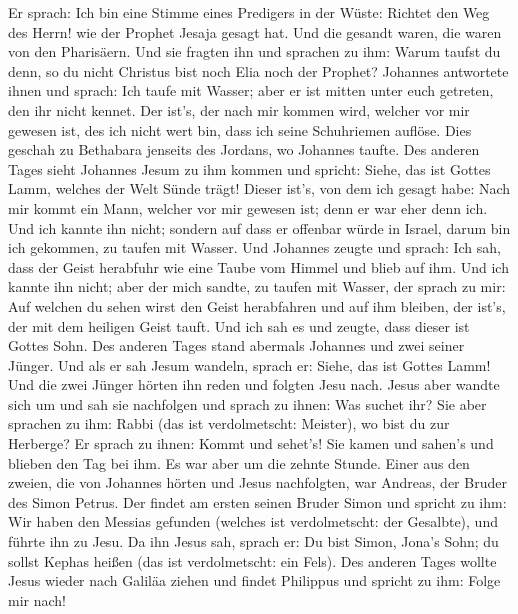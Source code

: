  Er sprach: Ich bin eine Stimme eines Predigers in der
Wüste: Richtet den Weg des Herrn! wie der Prophet Jesaja gesagt hat.
 Und die gesandt waren, die waren von den Pharisäern.
 Und sie fragten ihn und sprachen zu ihm: Warum taufst du
denn, so du nicht Christus bist noch Elia noch der Prophet?
 Johannes antwortete ihnen und sprach: Ich taufe mit
Wasser; aber er ist mitten unter euch getreten, den ihr nicht kennet.
 Der ist's, der nach mir kommen wird, welcher vor mir
gewesen ist, des ich nicht wert bin, dass ich seine Schuhriemen auflöse.
 Dies geschah zu Bethabara jenseits des Jordans, wo
Johannes taufte.  Des anderen Tages sieht Johannes Jesum zu
ihm kommen und spricht: Siehe, das ist Gottes Lamm, welches der Welt
Sünde trägt!  Dieser ist's, von dem ich gesagt habe: Nach
mir kommt ein Mann, welcher vor mir gewesen ist; denn er war eher denn
ich.  Und ich kannte ihn nicht; sondern auf dass er
offenbar würde in Israel, darum bin ich gekommen, zu taufen mit Wasser.
 Und Johannes zeugte und sprach: Ich sah, dass der Geist
herabfuhr wie eine Taube vom Himmel und blieb auf ihm.  Und
ich kannte ihn nicht; aber der mich sandte, zu taufen mit Wasser, der
sprach zu mir: Auf welchen du sehen wirst den Geist herabfahren und auf
ihm bleiben, der ist's, der mit dem heiligen Geist tauft. 
Und ich sah es und zeugte, dass dieser ist Gottes Sohn. 
Des anderen Tages stand abermals Johannes und zwei seiner Jünger.
 Und als er sah Jesum wandeln, sprach er: Siehe, das ist
Gottes Lamm!  Und die zwei Jünger hörten ihn reden und
folgten Jesu nach.  Jesus aber wandte sich um und sah sie
nachfolgen und sprach zu ihnen: Was suchet ihr? Sie aber sprachen zu
ihm: Rabbi (das ist verdolmetscht: Meister), wo bist du zur Herberge?
 Er sprach zu ihnen: Kommt und sehet's! Sie kamen und
sahen's und blieben den Tag bei ihm. Es war aber um die zehnte Stunde.
 Einer aus den zweien, die von Johannes hörten und Jesus
nachfolgten, war Andreas, der Bruder des Simon Petrus.  Der
findet am ersten seinen Bruder Simon und spricht zu ihm: Wir haben den
Messias gefunden (welches ist verdolmetscht: der Gesalbte),
 und führte ihn zu Jesu. Da ihn Jesus sah, sprach er: Du
bist Simon, Jona's Sohn; du sollst Kephas heißen (das ist verdolmetscht:
ein Fels).  Des anderen Tages wollte Jesus wieder nach
Galiläa ziehen und findet Philippus und spricht zu ihm: Folge mir nach!
